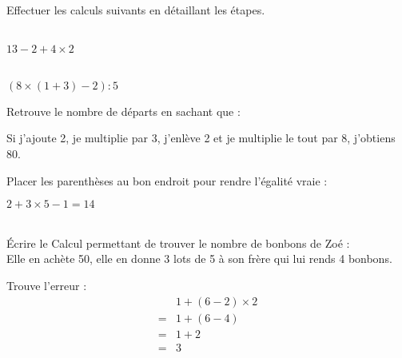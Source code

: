 

Effectuer les calculs suivants en détaillant les étapes.

\begin{multicols}{2}
    \cnt\\ 
    $13-2+4\times 2$

    \vspace*{14em}
    \columnbreak
    \cnt\\
    $(8\times (1+3)-2):5$

    \vspace*{14em}
\end{multicols}

\begin{multicols}{2}
    
    Retrouve le nombre de départs en sachant que : 
    
    Si j'ajoute 2, je multiplie par 3, j'enlève 2 et je multiplie le tout par 8, j'obtiens 80.

    \vspace*{14em}
    \columnbreak
    
    Placer les parenthèses au bon endroit pour rendre l'égalité vraie :
    
    $2+3\times 5-1=14$

    \vspace*{14em}
\end{multicols}

\begin{multicols}{2}
    \\
    Écrire le Calcul permettant de trouver le nombre de bonbons de Zoé : \vspace*{1em} \\   
    Elle en achète 50, elle en donne 3 lots de 5 à son frère qui lui rends 4 bonbons.
    \vspace*{6em}
    
    \columnbreak
    
    Trouve l'erreur :
    \begin{align*}
        &1+(6-2)\times 2\\
        =&1+(6-4)\\
        =&1+2\\
        =&3
    \end{align*}
    \vspace*{6em}
\end{multicols}

